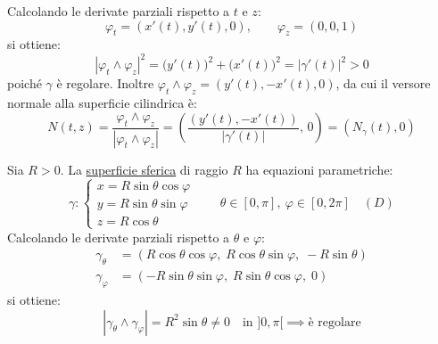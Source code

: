 \begin{esercizio}
\begin{center}
\end{center}

Calcolando le derivate parziali rispetto a $t$ e $z$:
\[
\varphi_t = (x'(t), y'(t), 0), \qquad \varphi_z = (0, 0, 1)
\]
si ottiene:
\[
|\varphi_t \wedge \varphi_z|^2 = \big(y'(t)\big)^2 + \big(x'(t)\big)^2 = |\gamma'(t)|^2 > 0
\]
poiché $\gamma$ è regolare. Inoltre $\varphi_t \wedge \varphi_z = (y'(t), -x'(t), 0)$, da cui il versore normale alla superficie cilindrica è:
\[
N(t, z) = \frac{\varphi_t \wedge \varphi_z}{|\varphi_t \wedge \varphi_z|} = \left( \frac{(y'(t), -x'(t))}{|\gamma'(t)|},\, 0 \right) = (N_\gamma(t), 0)
\]
\end{esercizio}



\begin{esercizio}
Sia $R > 0$. La \underline{superficie sferica} di raggio $R$ ha equazioni parametriche:
\[
\gamma : \begin{cases}
x = R \sin\theta \cos\varphi \\
y = R \sin\theta \sin\varphi \\
z = R \cos\theta
\end{cases}
\qquad \theta \in [0, \pi], \ \varphi \in [0, 2\pi] \quad (D)
\]
Calcolando le derivate parziali rispetto a $\theta$ e $\varphi$:
\begin{align*}
\gamma_\theta &= (R \cos\theta \cos\varphi,\; R \cos\theta \sin\varphi,\; -R \sin\theta) \\
\gamma_\varphi &= (-R \sin\theta \sin\varphi,\; R \sin\theta \cos\varphi,\; 0)
\end{align*}
si ottiene:
\[
|\gamma_\theta \wedge \gamma_\varphi| = R^2 \sin\theta \neq 0 \quad \text{in } ]0, \pi[ \implies \text{è regolare}
\]
\end{esercizio}

